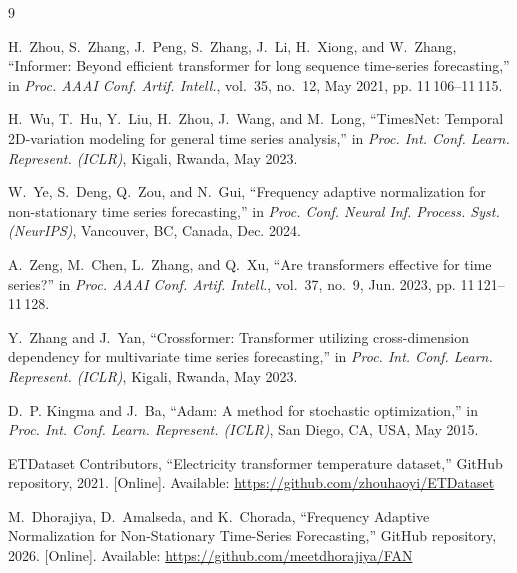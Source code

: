 \documentclass[journal]{IEEEtran}
\begin{document}
\begin{thebibliography}{9}

H.~Zhou, S.~Zhang, J.~Peng, S.~Zhang, J.~Li, H.~Xiong, and W.~Zhang, ``Informer: Beyond efficient transformer for long sequence time-series forecasting,'' in \emph{Proc. AAAI Conf. Artif. Intell.}, vol.~35, no.~12, May 2021, pp. 11\,106--11\,115.

H.~Wu, T.~Hu, Y.~Liu, H.~Zhou, J.~Wang, and M.~Long, ``TimesNet: Temporal 2D-variation modeling for general time series analysis,'' in \emph{Proc. Int. Conf. Learn. Represent. (ICLR)}, Kigali, Rwanda, May 2023.

W.~Ye, S.~Deng, Q.~Zou, and N.~Gui, ``Frequency adaptive normalization for non-stationary time series forecasting,'' in \emph{Proc. Conf. Neural Inf. Process. Syst. (NeurIPS)}, Vancouver, BC, Canada, Dec. 2024.

A.~Zeng, M.~Chen, L.~Zhang, and Q.~Xu, ``Are transformers effective for time series?'' in \emph{Proc. AAAI Conf. Artif. Intell.}, vol.~37, no.~9, Jun. 2023, pp. 11\,121--11\,128.

Y.~Zhang and J.~Yan, ``Crossformer: Transformer utilizing cross-dimension dependency for multivariate time series forecasting,'' in \emph{Proc. Int. Conf. Learn. Represent. (ICLR)}, Kigali, Rwanda, May 2023.

D.~P. Kingma and J.~Ba, ``Adam: A method for stochastic optimization,'' in \emph{Proc. Int. Conf. Learn. Represent. (ICLR)}, San Diego, CA, USA, May 2015.

ETDataset Contributors, ``Electricity transformer temperature dataset,'' GitHub repository, 2021. [Online]. Available: \url{https://github.com/zhouhaoyi/ETDataset}

M.~Dhorajiya, D.~Amalseda, and K.~Chorada, ``Frequency Adaptive Normalization for Non-Stationary Time-Series Forecasting,'' GitHub repository, 2026. [Online]. Available: \url{https://github.com/meetdhorajiya/FAN}

\end{thebibliography}
\end{document}
